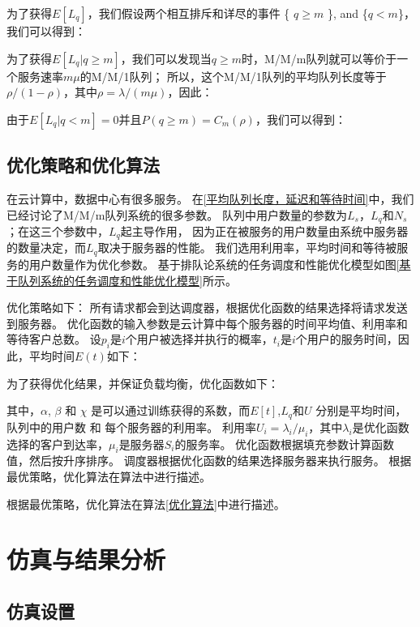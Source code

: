 \documentclass{morningstar}
\begin{document}
为了获得$E[L_q]$，我们假设两个相互排斥和详尽的事件 \{ $q \ge m $ \}, and \{$q < m$\}，我们可以得到：



为了获得$E[L_q | q \ge m ]$，我们可以发现当$q \ge m$时，M/M/m队列就可以等价于一个服务速率$m\mu$的M/M/1队列；
所以，这个M/M/1队列的平均队列长度等于$\rho / (1- \rho)$，其中$\rho = \lambda/ (m\mu)$，因此：


\noindent 由于$E[L_q|q<m] = 0 $并且$P(q\ge m)= C_m(\rho)$，我们可以得到：



\subsection{优化策略和优化算法}
在云计算中，数据中心有很多服务。
在\ref{平均队列长度，延迟和等待时间}中，我们已经讨论了M/M/m队列系统的很多参数。
队列中用户数量的参数为$L_s$，$L_q$和$N_s$；在这三个参数中，$L_q$起主导作用，
因为正在被服务的用户数量由系统中服务器的数量决定，而$L_q$取决于服务器的性能。
我们选用利用率，平均时间和等待被服务的用户数量作为优化参数。
基于排队论系统的任务调度和性能优化模型如图\ref{基于队列系统的任务调度和性能优化模型}所示。


优化策略如下：
所有请求都会到达调度器，根据优化函数的结果选择将请求发送到服务器。
优化函数的输入参数是云计算中每个服务器的时间平均值、利用率和等待客户总数。
设$p_i$是$i$个用户被选择并执行的概率，$t_i$是$i$个用户的服务时间，因此，平均时间$E(t)$如下：


\noindent 为了获得优化结果，并保证负载均衡，优化函数如下：


\noindent 其中，$\alpha$, $\beta$ 和 $\chi$ 是可以通过训练获得的系数，而$E[t]$,$L_q$和$U$ 分别是平均时间，队列中的用户数 和 每个服务器的利用率。
利用率$U_i = \lambda_i/ \mu_i$，其中$\lambda_i$是优化函数选择的客户到达率，$\mu_i$是服务器$S_i$的服务率。
优化函数根据填充参数计算函数值，然后按升序排序。
调度器根据优化函数的结果选择服务器来执行服务。
根据最优策略，优化算法在算法中进行描述。
\par

根据最优策略，优化算法在算法\ref{优化算法}中进行描述。



\section{仿真与结果分析}

\subsection{仿真设置}
\end{document}
